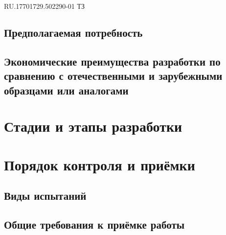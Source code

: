 \begin{uspd}{RU.17701729.502290-01 ТЗ}
    
\subsection{Предполагаемая потребность}

    
\subsection{Экономические преимущества разработки по сравнению с отечественными и зарубежными образцами или аналогами}

    

\section{Стадии и этапы разработки}

    
\section{Порядок контроля и приёмки}

    \subsection{Виды испытаний}

    
\subsection{Общие требования к приёмке работы}

    




\end{uspd}

